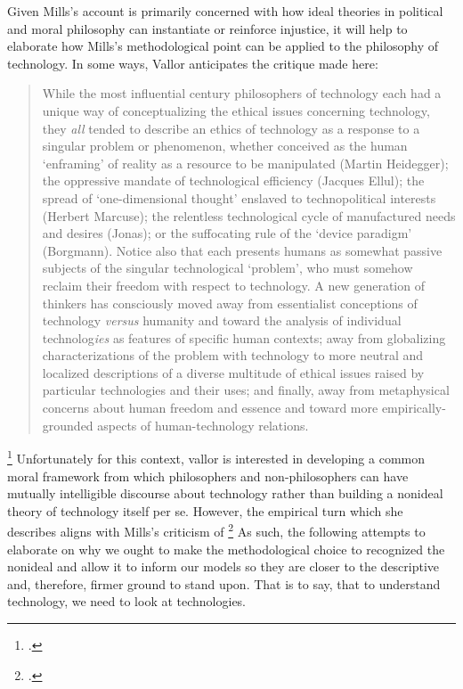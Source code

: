 \documentclass[letterpaper,notitlepage,12pt]{article}
\begin{document}
Given Mills's account is primarily concerned with how  ideal theories in 
political and moral philosophy can instantiate or reinforce injustice, it will
help to elaborate how Mills's methodological point can be applied to the
philosophy of technology.
In some ways, Vallor anticipates the critique made here: \blockquote{While the most influential
  \nth{20]} century philosophers of technology each had a unique way of
  conceptualizing the ethical issues concerning technology, they \textit{all}
  tended to describe an ethics of technology as a response to a singular problem
  or phenomenon, whether conceived as the human `enframing' of reality as a
  resource to be manipulated (Martin Heidegger); the oppressive mandate of
  technological efficiency (Jacques Ellul); the spread of `one-dimensional
  thought' enslaved to technopolitical interests (Herbert Marcuse); the
  relentless technological cycle of manufactured needs and desires (Jonas); or
  the suffocating rule of the `device paradigm' (Borgmann).
  Notice also that each presents humans as somewhat passive
  subjects of the singular technological `problem', who must somehow reclaim
  their freedom with respect to technology. A new generation of thinkers has
  consciously moved away from essentialist conceptions of technology
  \textit{versus} humanity and toward the analysis of individual
  technolog\textit{ies} as features of specific human contexts; away from
  globalizing characterizations of the problem with technology to more neutral
  and localized descriptions of a diverse multitude of ethical issues raised by
  particular technologies and their uses; and finally, away from metaphysical
  concerns about human freedom and essence and toward more empirically-grounded
aspects of human-technology relations.}\footcite[p. 31]{vallor_technology_2018}
Unfortunately for this context, vallor is interested in developing a common
moral framework from which philosophers and non-philosophers can have mutually
intelligible discourse about technology rather than building a nonideal theory
of technology itself per se.
However, the empirical turn which she describes aligns with Mills's criticism of
\footcite[p. 168]{mills_ideal_2005}
As such, the following attempts to elaborate on why we ought to make the
methodological choice to recognized the nonideal and allow it to inform our
models so they are closer to the descriptive and, therefore, firmer ground to
stand upon.
That is to say, that to understand technology, we need to look at technologies.
\end{document}
